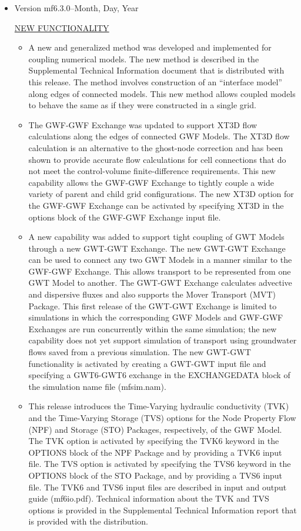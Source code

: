 \documentclass[11pt,twoside,twocolumn]{usgsreport}
\begin{document}
\begin{itemize}
	\item Version mf6.3.0--Month, Day, Year
	
	\underline{NEW FUNCTIONALITY}
	\begin{itemize}
	        \item A new and generalized method was developed and implemented for coupling numerical models.  The new method is described in the Supplemental Technical Information document that is distributed with this release.  The method involves construction of an ``interface model'' along edges of connected models.  This new method allows coupled models to behave the same as if they were constructed in a single grid.
	        \item The GWF-GWF Exchange was updated to support XT3D flow calculations along the edges of connected GWF Models.  The XT3D flow calculation is an alternative to the ghost-node correction and has been shown to provide accurate flow calculations for cell connections that do not meet the control-volume finite-difference requirements.  This new capability allows the GWF-GWF Exchange to tightly couple a wide variety of parent and child grid configurations.  The new XT3D option for the GWF-GWF Exchange can be activated by specifying XT3D in the options block of the GWF-GWF Exchange input file.
	        \item A new capability was added to support tight coupling of GWT Models through a new GWT-GWT Exchange.  The new GWT-GWT Exchange can be used to connect any two GWT Models in a manner similar to the GWF-GWF Exchange.  This allows transport to be represented from one GWT Model to another.  The GWT-GWT Exchange calculates advective and dispersive fluxes and also supports the Mover Transport (MVT) Package.  This first release of the GWT-GWT Exchange is limited to simulations in which the corresponding GWF Models and GWF-GWF Exchanges are run concurrently within the same simulation; the new capability does not yet support simulation of transport using groundwater flows saved from a previous simulation.  The new GWT-GWT functionality is activated by creating a GWT-GWT input file and specifying a GWT6-GWT6 exchange in the EXCHANGEDATA block of the simulation name file (mfsim.nam).
	        \item This release introduces the Time-Varying hydraulic conductivity (TVK) and the Time-Varying Storage (TVS) options for the Node Property Flow (NPF) and Storage (STO) Packages, respectively, of the GWF Model.  The TVK option is activated by specifying the TVK6 keyword in the OPTIONS block of the NPF Package and by providing a TVK6 input file.  The TVS option is activated by specifying the TVS6 keyword in the OPTIONS block of the STO Package, and by providing a TVS6 input file.  The TVK6 and TVS6 input files are described in input and output guide (mf6io.pdf).  Technical information about the TVK and TVS options is provided in the Supplemental Technical Information report that is provided with the distribution.

\end{itemize}
\end{itemize}
\end{document}
